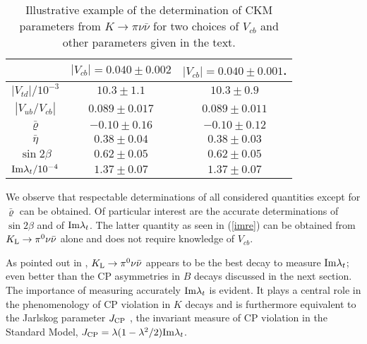 \begin{table}
\caption[]{Illustrative example of the determination of CKM
parameters from $K\to\pi\nu\bar\nu$ for two choices of
$V_{cb}$ and other parameters given in the text.
\label{tabkb1}}
\begin{center}
\begin{tabular}{|c||c|c|}\hline
&$|V_{cb}|=0.040\pm 0.002$&$|V_{cb}|=0.040\pm 0.001$.\\ 
\hline
\hline
$|V_{td}|/10^{-3}$&$10.3\pm 1.1$&$10.3\pm 0.9$\\ 
\hline
$|V_{ub}/V_{cb}|$&$0.089\pm 0.017$
&$0.089\pm 0.011$ \\
\hline 
$\bar\varrho$&$-0.10\pm 0.16$ &$-0.10\pm 0.12$\\
\hline
$\bar\eta$&$0.38\pm 0.04$&$0.38\pm 0.03$\\
\hline
$\sin 2\beta$&$0.62\pm 0.05$&$0.62\pm 0.05$\\
\hline
${\rm Im}\lambda_t/10^{-4}$&$1.37\pm 0.07$
&$1.37\pm 0.07$ \\
\hline
\end{tabular}
\end{center}
\end{table}


We observe that respectable determinations of all considered 
quantities except for 
$\bar\varrho$ can be obtained.
Of particular interest are the accurate determinations of
$\sin 2\beta$ and of ${\rm Im}\lambda_t$.
The latter quantity as seen in (\ref{imre}) 
can be obtained from
$K_{\rm L}\to\pi^0\nu\bar\nu$ alone and does not require knowledge
of $V_{cb}$.

As pointed out in \cite{BB96},
$K_{\rm L}\to\pi^0\nu\bar\nu$ appears to be the best decay to 
measure ${\rm Im}\lambda_t$; even better than the CP asymmetries
in $B$ decays discussed in the next section.
The importance of measuring accurately  ${\rm Im}\lambda_t$ is evident.
It plays a central role in the phenomenology of CP violation
in $K$ decays and is furthermore equivalent to the 
Jarlskog parameter $J_{\rm CP}$ \cite{CJ}, 
the invariant measure of CP violation in the Standard Model, 
$J_{\rm CP}=\lambda(1-\lambda^2/2){\rm Im}\lambda_t$.

